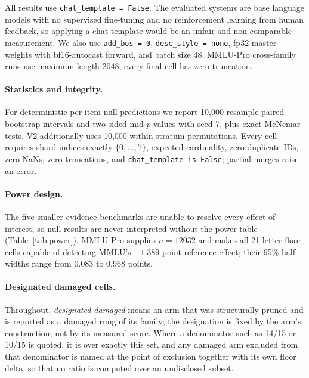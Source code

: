 All results use \texttt{chat\_template = False}. The evaluated systems are base language models with no supervised fine-tuning and no reinforcement learning from human feedback, so applying a chat template would be an unfair and non-comparable measurement. We also use \texttt{add\_bos = 0}, \texttt{desc\_style = none}, fp32 master weights with bf16-autocast forward, and batch size 48. MMLU-Pro cross-family runs use maximum length 2048; every final cell has zero truncation.

\paragraph{Statistics and integrity.}
For deterministic per-item null predictions we report 10,000-resample paired-bootstrap intervals and two-sided mid-$p$ values with seed 7, plus exact McNemar tests. V2 additionally uses 10,000 within-stratum permutations. Every cell requires shard indices exactly $\{0,\ldots,7\}$, expected cardinality, zero duplicate IDs, zero NaNs, zero truncations, and \texttt{chat\_template is False}; partial merges raise an error.

\paragraph{Power design.}
The five smaller evidence benchmarks are unable to resolve every effect of interest, so null results are never interpreted without the power table (Table~\ref{tab:power}).
MMLU-Pro supplies $n=12032$ and makes all 21 letter-floor cells capable of detecting MMLU's $-1.389$-point reference effect; their 95\% half-widths range from 0.083 to 0.968 points.



\paragraph{Designated damaged cells.} Throughout, \emph{designated damaged} means an arm that was structurally pruned and is reported as a damaged rung of its family; the designation is fixed by the arm's construction, not by its measured score. Where a denominator such as 14/15 or 10/15 is quoted, it is over exactly this set, and any damaged arm excluded from that denominator is named at the point of exclusion together with its own floor delta, so that no ratio is computed over an undisclosed subset.

